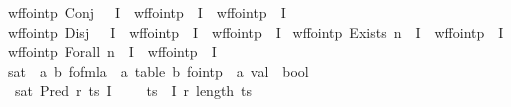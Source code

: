 \begin{isabellebody}
{\isacharbar}{\kern0pt}\ {\isachardoublequoteopen}wf{\isacharunderscore}{\kern0pt}fo{\isacharunderscore}{\kern0pt}intp\ {\isacharparenleft}{\kern0pt}Conj\ {\isasymphi}\ {\isasympsi}{\isacharparenright}{\kern0pt}\ I\ {\isasymlongleftrightarrow}\ wf{\isacharunderscore}{\kern0pt}fo{\isacharunderscore}{\kern0pt}intp\ {\isasymphi}\ I\ {\isasymand}\ wf{\isacharunderscore}{\kern0pt}fo{\isacharunderscore}{\kern0pt}intp\ {\isasympsi}\ I{\isachardoublequoteclose}\isanewline
{\isacharbar}{\kern0pt}\ {\isachardoublequoteopen}wf{\isacharunderscore}{\kern0pt}fo{\isacharunderscore}{\kern0pt}intp\ {\isacharparenleft}{\kern0pt}Disj\ {\isasymphi}\ {\isasympsi}{\isacharparenright}{\kern0pt}\ I\ {\isasymlongleftrightarrow}\ wf{\isacharunderscore}{\kern0pt}fo{\isacharunderscore}{\kern0pt}intp\ {\isasymphi}\ I\ {\isasymand}\ wf{\isacharunderscore}{\kern0pt}fo{\isacharunderscore}{\kern0pt}intp\ {\isasympsi}\ I{\isachardoublequoteclose}\isanewline
{\isacharbar}{\kern0pt}\ {\isachardoublequoteopen}wf{\isacharunderscore}{\kern0pt}fo{\isacharunderscore}{\kern0pt}intp\ {\isacharparenleft}{\kern0pt}Exists\ n\ {\isasymphi}{\isacharparenright}{\kern0pt}\ I\ {\isasymlongleftrightarrow}\ wf{\isacharunderscore}{\kern0pt}fo{\isacharunderscore}{\kern0pt}intp\ {\isasymphi}\ I{\isachardoublequoteclose}\isanewline
{\isacharbar}{\kern0pt}\ {\isachardoublequoteopen}wf{\isacharunderscore}{\kern0pt}fo{\isacharunderscore}{\kern0pt}intp\ {\isacharparenleft}{\kern0pt}Forall\ n\ {\isasymphi}{\isacharparenright}{\kern0pt}\ I\ {\isasymlongleftrightarrow}\ wf{\isacharunderscore}{\kern0pt}fo{\isacharunderscore}{\kern0pt}intp\ {\isasymphi}\ I{\isachardoublequoteclose}\isanewline
\isanewline
{}\isamarkupfalse%
\ sat\ {\isacharcolon}{\kern0pt}{\isacharcolon}{\kern0pt}\ {\isachardoublequoteopen}{\isacharparenleft}{\kern0pt}{\isacharprime}{\kern0pt}a{\isacharcomma}{\kern0pt}\ {\isacharprime}{\kern0pt}b{\isacharparenright}{\kern0pt}\ fo{\isacharunderscore}{\kern0pt}fmla\ {\isasymRightarrow}\ {\isacharparenleft}{\kern0pt}{\isacharprime}{\kern0pt}a\ table{\isacharcomma}{\kern0pt}\ {\isacharprime}{\kern0pt}b{\isacharparenright}{\kern0pt}\ fo{\isacharunderscore}{\kern0pt}intp\ {\isasymRightarrow}\ {\isacharprime}{\kern0pt}a\ val\ {\isasymRightarrow}\ bool{\isachardoublequoteclose}\ \isanewline
\ \ {\isachardoublequoteopen}sat\ {\isacharparenleft}{\kern0pt}Pred\ r\ ts{\isacharparenright}{\kern0pt}\ I\ {\isasymsigma}\ {\isasymlongleftrightarrow}\ {\isasymsigma}\ {\isasymodot}\ ts\ {\isasymin}\ I\ {\isacharparenleft}{\kern0pt}r{\isacharcomma}{\kern0pt}\ length\ ts{\isacharparenright}{\kern0pt}{\isachardoublequoteclose}\isanewline

\end{isabellebody}
